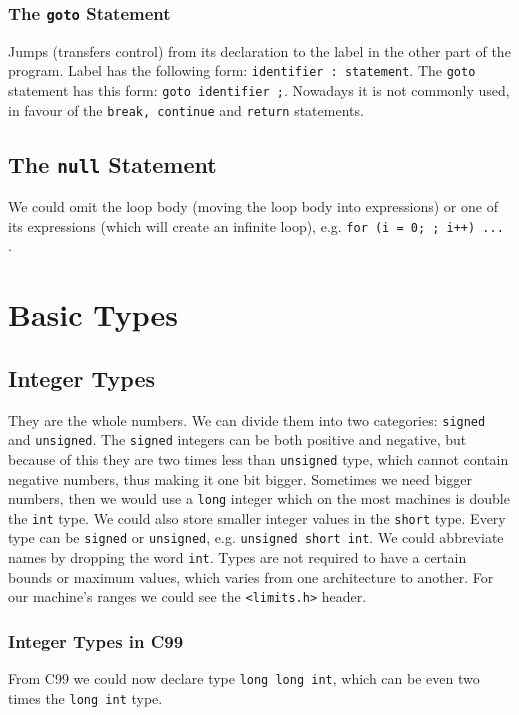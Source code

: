 \documentclass[openany]{book}
\begin{document}
    \subsection*{The \texttt{goto} Statement}
    Jumps (transfers control) from its declaration to the label in the other part
    of the program. Label has the following form: \texttt{identifier : statement}.
    The \texttt{goto} statement has this form: \texttt{goto identifier ;}. Nowadays
    it is not commonly used, in favour of the \texttt{break, continue} and
    \texttt{return} statements.

    \section{The \texttt{null} Statement}
    We could omit the loop body (moving the loop body into expressions) or one of
    its expressions (which will create an infinite loop), e.g.
    \texttt{for (i = 0; ; i++) {...} }.

    \chapter{Basic Types}

    \section{Integer Types}
    They are the whole numbers. We can divide them into two categories: \texttt{signed}
    and \texttt{unsigned}. The \texttt{signed} integers can be both positive and
    negative, but because of this they are two times less than \texttt{unsigned} type,
    which cannot contain negative numbers, thus making it one bit bigger. Sometimes we
    need bigger numbers, then we would use a \texttt{long} integer which on the most
    machines is double the \texttt{int} type. We could also store smaller integer values
    in the \texttt{short} type. Every type can be \texttt{signed} or \texttt{unsigned},
    e.g. \texttt{unsigned short int}. We could abbreviate names by dropping the word
    \texttt{int}. Types are not required to have a certain bounds or maximum values, which
    varies from one architecture to another. For our machine's ranges we could see the
    \texttt{<limits.h>} header.

    \subsection*{Integer Types in C99}
    From C99 we could now declare type \texttt{long long int}, which can be even two
    times the \texttt{long int} type.
\end{document}
